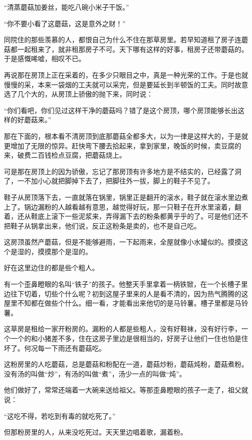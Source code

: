 \par “清蒸蘑菇加姜丝，能吃八碗小米子干饭。”
\par “你不要小看了这蘑菇，这是意外之财！”
\par 同院住的那些羡慕的人，都恨自己为什么不住在那草房里。若早知道租了房子连蘑菇都一起租来了，就非租那房子不可。天下哪有这样的好事，租房子还带蘑菇的。于是感慨唏嘘，相叹不已。
\par 再说那在房顶上正在采着的，在多少只眼目之中，真是一种光荣的工作。于是也就慢慢的采，本来一袋烟的工夫就可以采完，但是要延长到半顿饭的工夫。同时故意选了几个大的，从房顶上骄傲的抛下来，同时说：
\par “你们看吧，你们见过这样干净的蘑菇吗？错了是这个房顶，哪个房顶能够长出这样的好蘑菇来。”
\par 那在下面的，根本看不清房顶到底那蘑菇全都多大，以为一律是这样大的，于是就更增加了无限的惊异。赶快弯下腰去拾起来，拿到家里，晚饭的时候，卖豆腐的来，破费二百钱检点豆腐，把蘑菇烧上。
\par 可是那在房顶上的因为骄傲，忘记了那房顶有许多地方是不结实的，已经露了洞了，一不加小心就把脚掉下去了，把脚往外一拔，脚上的鞋子不见了。
\par 鞋子从房顶落下去，一直就落在锅里，锅里正是翻开的滚水，鞋子就在滚水里边煮上了。锅边漏粉的人越看越有意思，越觉得好玩，那一只鞋子在开水里滚着，翻着，还从鞋底上滚下一些泥浆来，弄得漏下去的粉条都黄乎乎的了。可是他们还不把鞋子从锅拿出来，他们说，反正这粉条是卖的，也不是自己吃。
\par 这房顶虽然产蘑菇，但是不能够避雨，一下起雨来，全屋就像小水罐似的。摸摸这个是湿的，摸摸那个是湿的。
\par 好在这里边住的都是些个粗人。
\par 有一个歪鼻瞪眼的名叫“铁子”的孩子。他整天手里拿着一柄铁锨，在一个长槽子里边往下切着，切些个什么呢？初到这屋子里来的人是看不清的，因为热气腾腾的这屋里不知都在做些个什么。细一看，才能看出来他切的是马铃薯。槽子里都是马铃薯。
\par 这草房是租给一家开粉房的。漏粉的人都是些粗人，没有好鞋袜，没有好行李，一个一个的和小猪差不多，住在这房子里边是很相当的，好房子让他们一住也怕是住坏了。何况每一下雨还有蘑菇吃。
\par 这粉房里的人吃蘑菇，总是蘑菇和粉配在一道，蘑菇炒粉，蘑菇炖粉，蘑菇煮粉。没有汤的叫做“炒”，有汤的叫做“煮”，汤少一点的叫做“炖”。
\par 他们做好了，常常还端着一大碗来送给祖父。等那歪鼻瞪眼的孩子一走了，祖父就说：
\par “这吃不得，若吃到有毒的就吃死了。”
\par 但那粉房里的人，从来没吃死过。天天里边唱着歌，漏着粉。
